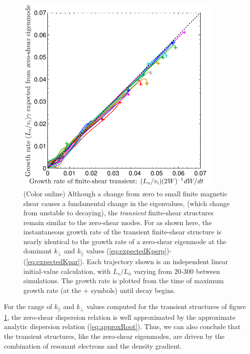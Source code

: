 \documentclass[12pt,superscriptaddress]{revtex4}
\begin{document}
\begin{figure}[h!]
\includegraphics[width=4in]{m20150109_04_cmprngTransientGrowthRateTo0ShearForPaper.pdf}
\caption{(Color online)
Although a change from zero to small finite magnetic shear causes a fundamental change in the eigenvalues,
(which change from unstable to decaying),
the \emph{transient} finite-shear structures remain similar to the zero-shear modes.  For as shown here,
the instantaneous growth rate of the transient finite-shear structure is nearly identical
to the growth rate of a zero-shear eigenmode at the dominant $k_{\perp}$ and $k_{||}$ values
(\ref{eq:expectedKperp})-(\ref{eq:expectedKpar}).  Each trajectory shown is an independent
linear initial-value calculation, with $L_s/L_n$ varying from 20-300 between simulations.  The growth rate is plotted from
the time of maximum growth rate (at the $+$ symbols) until decay begins.
\label{fig:comparingTransientTo0Shear}}
\end{figure}

For the range of $k_{||}$ and $k_{\perp}$ values computed for the transient structures
of figure \ref{fig:comparingTransientTo0Shear}, the zero-shear dispersion relation
is well approximated by the approximate analytic dispersion relation (\ref{eq:approxRoot}).  Thus, we can also conclude
that the transient structures, like the zero-shear eigenmodes,
are driven by the combination of resonant electrons and the density gradient.
\end{document}
